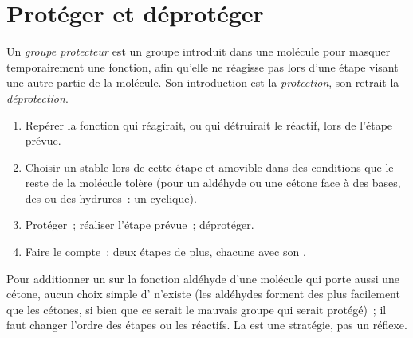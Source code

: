 \section{Protéger et déprotéger}

\begin{definition}\label{def:b1:acetals-protection:protecting-group}
Un \emph{groupe protecteur} est un groupe
introduit dans une molécule pour masquer temporairement une fonction,
afin qu'elle ne réagisse pas lors d'une étape visant une autre partie de
la molécule. Son introduction est la \emph{protection},
son retrait la \emph{déprotection}.
\end{definition}

\begin{method}\label{met:b1:acetals-protection:protect}
\begin{enumerate}
  \item Repérer la fonction qui réagirait, ou qui détruirait le réactif,
        lors de l'étape prévue.
  \item Choisir un  stable lors de cette étape et
        amovible dans des conditions que le reste de la molécule tolère
        (pour un aldéhyde ou une cétone face à des bases, des
         ou des hydrures~: un  cyclique).
  \item Protéger~; réaliser l'étape prévue~; déprotéger.
  \item Faire le compte~: deux étapes de plus, chacune avec son
        .
\end{enumerate}
\end{method}

\begin{example}\label{ex:b1:acetals-protection:ketoester}
Pour additionner un  sur la fonction aldéhyde d'une
molécule qui porte aussi une cétone, aucun choix simple d' n'existe
(les aldéhydes forment des  plus facilement que les cétones, si
bien que ce serait le mauvais groupe qui serait protégé)~; il faut
changer l'ordre des étapes ou les réactifs. La  est une
stratégie, pas un réflexe.
\end{example}

